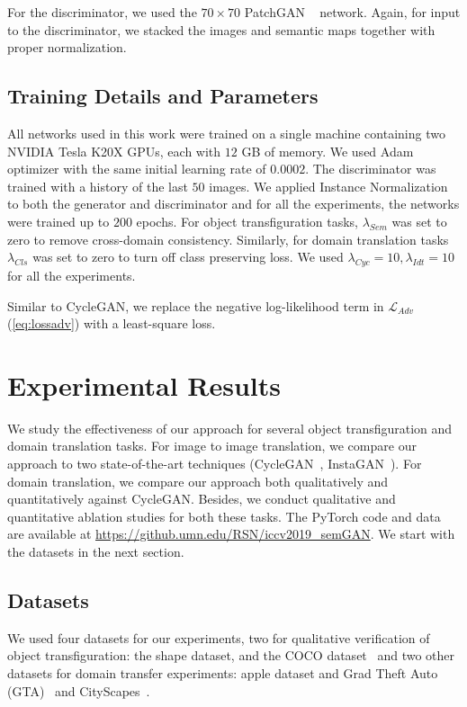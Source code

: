For the discriminator, we used the  $70\times 70$ PatchGAN ~\cite{isola_image--image_2016} network. Again, for input to the discriminator, we stacked the images and semantic maps together with proper normalization.

\subsection{Training Details and Parameters} 
All networks used in this work were trained on a single machine containing two NVIDIA Tesla K20X GPUs, each with $12$ GB of memory. We used Adam optimizer with the same initial learning rate of $0.0002$. The discriminator was trained with a history of the last $50$ images. We applied Instance Normalization to both the generator and discriminator and for all the experiments, the networks were trained up to $200$ epochs. For object transfiguration tasks, $\lambda_{Sem}$ was set to zero to remove cross-domain consistency. Similarly, for domain translation tasks $\lambda_{Cls}$ was set to zero to turn off class preserving loss. We used $\lambda_{Cyc} =10, \lambda_{Idt}=10$ for all the experiments.

Similar to CycleGAN, we replace the negative log-likelihood term in $\mathcal{L}_{Adv}$ (\eqref{eq:lossadv}) with a least-square loss.





\section{Experimental Results}\label{sec:rexperiments}
We study the effectiveness of our approach for several object transfiguration and domain translation tasks. For image to image translation, we compare our approach to two state-of-the-art techniques (CycleGAN~\cite{zhu_unpaired_2017}, InstaGAN~\cite{mo_instance-aware_2019}). For domain translation, we compare our approach both qualitatively and quantitatively against CycleGAN. Besides, we conduct qualitative and quantitative ablation studies for both these tasks. The PyTorch code and data are available at \url{https://github.umn.edu/RSN/iccv2019_semGAN}. We start with the datasets in the next section.

\subsection{Datasets}
 We used four datasets for our experiments, two for qualitative verification of object transfiguration: the shape dataset, and the COCO dataset~\cite{lin2014microsoft} and two other datasets for domain transfer experiments: apple dataset and Grad Theft Auto (GTA)~\cite{gta} and CityScapes~\cite{cordts2016cityscapes}.
 
